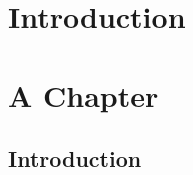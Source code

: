 \documentclass{ucetd}
\date{August 2023}
\title{\thesistitle}
\author{\thesisauthor}
\begin{document}
\maketitle

\makecopyright
\makededication
\makeepigraph


\tableofcontents
\listoffigures
\listoftables

\acknowledgments

\abstract

\mainmatter

\chapter{Introduction}

\chapter{A Chapter}
\section{Introduction}

\makebibliography
\nocite{*}

%
%
\end{document}
